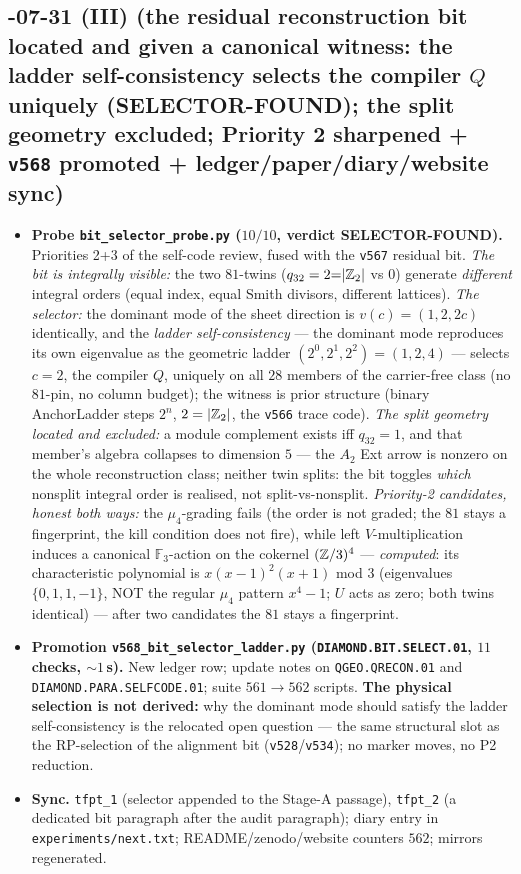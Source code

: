 \subsection*{-07-31 (III) (the residual reconstruction bit located and given a canonical witness: the ladder self-consistency selects the compiler $Q$ uniquely (SELECTOR-FOUND); the split geometry excluded; Priority 2 sharpened + \texttt{v568} promoted + ledger/paper/diary/website sync)}
\begin{itemize}[leftmargin=1.5em]
\item \textbf{Probe \texttt{bit\_selector\_probe.py} ($10/10$, verdict SELECTOR-FOUND).}
Priorities 2+3 of the self-code review, fused with the \texttt{v567} residual bit.
\emph{The bit is integrally visible:} the two $81$-twins ($q_{32}=2{=}|\mathbb{Z}_2|$ vs $0$)
generate \emph{different} integral orders (equal index, equal Smith divisors, different
lattices).  \emph{The selector:} the dominant mode of the sheet direction is $v(c)=(1,2,2c)$
identically, and the \emph{ladder self-consistency} --- the dominant mode reproduces its own
eigenvalue as the geometric ladder $(2^0,2^1,2^2)=(1,2,4)$ --- selects $c=2$, the compiler
$Q$, uniquely on all $28$ members of the carrier-free class (no $81$-pin, no column budget);
the witness is prior structure (binary AnchorLadder steps $2^n$, $2=|\mathbb{Z}_2|$, the \texttt{v566}
trace code).  \emph{The split geometry located and excluded:} a module complement exists iff
$q_{32}=1$, and that member's algebra collapses to dimension $5$ --- the $A_2$ Ext arrow is
nonzero on the whole reconstruction class; neither twin splits: the bit toggles \emph{which}
nonsplit integral order is realised, not split-vs-nonsplit.  \emph{Priority-2 candidates,
honest both ways:} the $\mu_4$-grading fails (the order is not graded; the $81$ stays a
fingerprint, the kill condition does not fire), while left $V$-multiplication induces a
canonical $\mathbb F_3$-action on the cokernel $(\mathbb{Z}/3)^4$ --- \emph{computed}: its
characteristic polynomial is $x(x-1)^2(x+1)$ mod $3$ (eigenvalues $\{0,1,1,-1\}$, NOT the
regular $\mu_4$ pattern $x^4-1$; $U$ acts as zero; both twins identical) --- after two
candidates the $81$ stays a fingerprint.
\item \textbf{Promotion \texttt{v568\_bit\_selector\_ladder.py} (\texttt{DIAMOND.BIT.SELECT.01},
$11$ checks, ${\sim}1$\,s).} New ledger row; update notes on \texttt{QGEO.QRECON.01} and
\texttt{DIAMOND.PARA.SELFCODE.01}; suite $561\to562$ scripts.  \textbf{The physical selection
is not derived:} why the dominant mode should satisfy the ladder self-consistency is the
relocated open question --- the same structural slot as the RP-selection of the alignment bit
(\texttt{v528}/\texttt{v534}); no marker moves, no P2 reduction.
\item \textbf{Sync.} \texttt{tfpt\_1} (selector appended to the Stage-A passage),
\texttt{tfpt\_2} (a dedicated bit paragraph after the audit paragraph); diary entry in
\texttt{experiments/next.txt}; README/zenodo/website counters $562$; mirrors regenerated.
\end{itemize}

